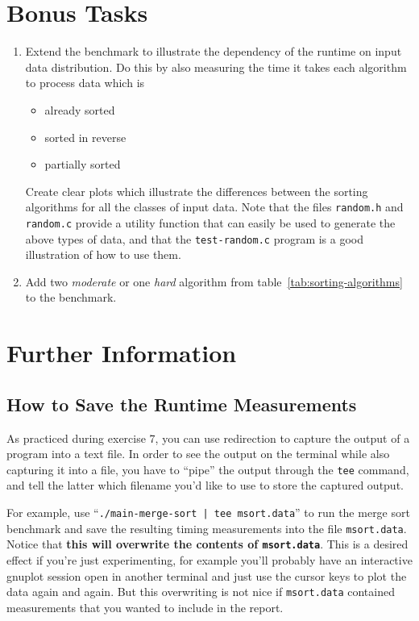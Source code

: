 \documentclass[a4paper,10pt]{article}
\begin{document}
\section{Bonus Tasks}

\begin{enumerate}

\item
  Extend the benchmark to illustrate the dependency of the runtime on input data distribution.
  Do this by also measuring the time it takes each algorithm to process data which is
  \begin{itemize}
  \item
    already sorted
  \item
    sorted in reverse
  \item
    partially sorted
  \end{itemize}
  Create clear plots which illustrate the differences between the sorting algorithms for all the classes of input data.
  Note that the files \texttt{random.h} and \texttt{random.c} provide a utility function that can easily be used to generate the above types of data, and that the \texttt{test-random.c} program is a good illustration of how to use them.
  
\item
  Add two \emph{moderate} or one \emph{hard} algorithm from table~\ref{tab:sorting-algorithms} to the benchmark.
  
\end{enumerate}



\section{Further Information}



\subsection*{How to Save the Runtime Measurements}

As practiced during exercise 7, you can use redirection to capture the output of a program into a text file.
In order to see the output on the terminal while also capturing it into a file, you have to ``pipe'' the output through the \texttt{tee} command, and tell the latter which filename you'd like to use to store the captured output.

For example, use ``\texttt{./main-merge-sort | tee msort.data}'' to run the merge sort benchmark and save the resulting timing measurements into the file \texttt{msort.data}.
Notice that \textbf{this will overwrite the contents of \texttt{msort.data}}.
This is a desired effect if you're just experimenting, for example you'll probably have an interactive gnuplot session open in another terminal and just use the cursor keys to plot the data again and again.
But this overwriting is not nice if \texttt{msort.data} contained measurements that you wanted to include in the report.
\end{document}
